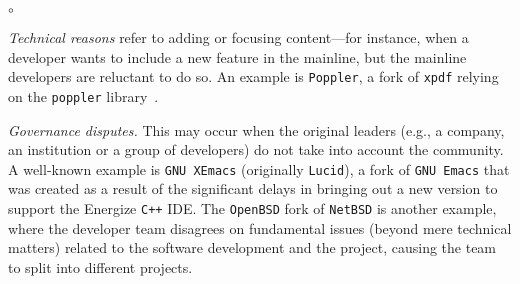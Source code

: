 \begin{list}{$\circ$}{}
   \item \textit{Technical reasons} refer to adding or focusing content---for instance, when a developer wants to include a new feature in the mainline, but the mainline developers are reluctant to do so. An example is \texttt{Poppler}, a fork of \texttt{xpdf} relying on the \texttt{poppler} library~\cite{Gregorio:2012}.

    \item \textit{Governance disputes.} This may occur when the original leaders (e.g., a company, an institution or a group of developers) do not take into account the community. A well-known example is \texttt{GNU XEmacs} (originally \texttt{Lucid}), a fork of \texttt{GNU Emacs} that was created as a result of the significant delays in bringing out a new version to support the Energize \texttt{C++} IDE. The \texttt{OpenBSD} fork of \texttt{NetBSD} is another example, where the developer team disagrees on fundamental issues (beyond mere technical matters) related to the software development and the project, causing the team to split into different projects. %





\end{list}
